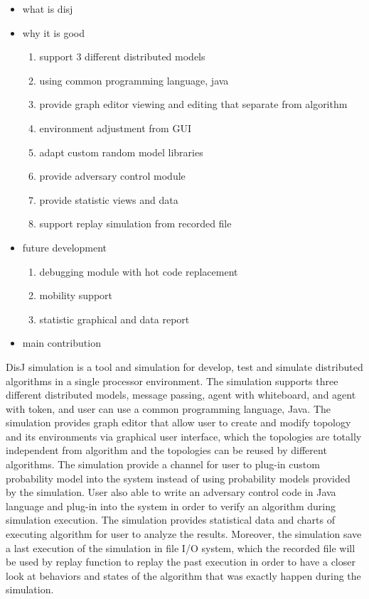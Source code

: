
\begin{itemize}
\item what is disj
\item why it is good
    \begin{enumerate}
    \item support 3 different distributed models
    \item using common programming language, java
    \item provide graph editor viewing and editing that separate from algorithm
    \item environment adjustment from GUI
    \item adapt custom random model libraries
    \item provide adversary control module
    \item provide statistic views and data
    \item support replay simulation from recorded file
    \end{enumerate}
\item future development
    \begin{enumerate}
    \item debugging module with hot code replacement
    \item mobility support
    \item statistic graphical and data report
    \end{enumerate}
\item main contribution
\end{itemize}

DisJ simulation is a tool and simulation for develop, test and simulate distributed algorithms in a single processor environment. The simulation supports three different distributed models, message passing, agent with whiteboard, and agent with token, and user can use a common programming language, Java. The simulation provides graph editor that allow user to create and modify topology and its environments via graphical user interface, which the topologies are totally independent from algorithm and the topologies can be reused by different algorithms. The simulation provide a channel for user to plug-in custom probability model into the system instead of using probability models provided by the simulation. User also able to write an adversary control code in Java language and plug-in into the system in order to verify an algorithm during simulation execution. The simulation provides statistical data and charts of executing algorithm for user to analyze the results. Moreover, the simulation save a last execution of the simulation in file I/O system, which the recorded file will be used by replay function to replay the past execution in order to have a closer look at behaviors and states of the algorithm that was exactly happen during the simulation.

